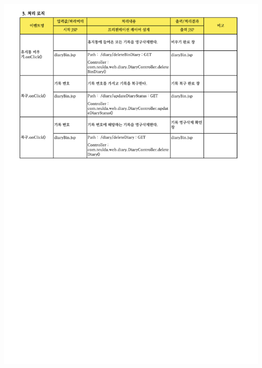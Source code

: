 {{{{{{{{{{{{{{{{{{{{{{{{{{{{{{{{{{{{{{{{{{\includegraphics[width=20cm]{./Figure/Design/Display/diary/diary_24.pdf} \\
}}}}}}}}}}}}}}}}}}}}}}}}}}}}}}}}}}}}}}}}}}
